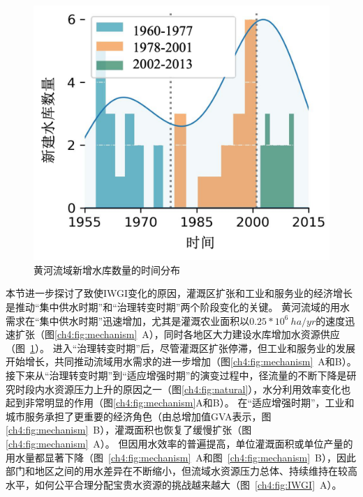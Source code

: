 \begin{figure}[tb]
    \centering
    \includegraphics[width=0.6\linewidth]{img/ch4/ch4_reservoirs.png}
    \caption{黄河流域新增水库数量的时间分布}\label{ch4:fig:reservoirs}
\end{figure}


本节进一步探讨了致使IWGI变化的原因，灌溉区扩张和工业和服务业的经济增长是推动“集中供水时期”和“治理转变时期”两个阶段变化的关键。
黄河流域的用水需求在“集中供水时期”迅速增加，尤其是灌溉农业面积以$0.25*10^6~ha/yr$的速度迅速扩张（图\ref{ch4:fig:mechanism}~A），同时各地区大力建设水库增加水资源供应（图~\ref{ch4:fig:reservoirs}）。
进入“治理转变时期”后，尽管灌溉区扩张停滞，但工业和服务业的发展开始增长，共同推动流域用水需求的进一步增加（图\ref{ch4:fig:mechanism}~A和B）。
接下来从“治理转变时期”到“适应增强时期”的演变过程中，径流量的不断下降是研究时段内水资源压力上升的原因之一（图\ref{ch4:fig:natural}），水分利用效率变化也起到非常明显的作用（图\ref{ch4:fig:mechanism}A和B）。
在“适应增强时期”，工业和城市服务承担了更重要的经济角色（由总增加值GVA表示，图\ref{ch4:fig:mechanism}~B），灌溉面积也恢复了缓慢扩张（图\ref{ch4:fig:mechanism}~A）。
但因用水效率的普遍提高，单位灌溉面积或单位产量的用水量都显著下降（图~\ref{ch4:fig:mechanism}~A和图~\ref{ch4:fig:mechanism}~B），因此部门和地区之间的用水差异在不断缩小，但流域水资源压力总体、持续维持在较高水平，如何公平合理分配宝贵水资源的挑战越来越大（图~\ref{ch4:fig:IWGI}~A）。

